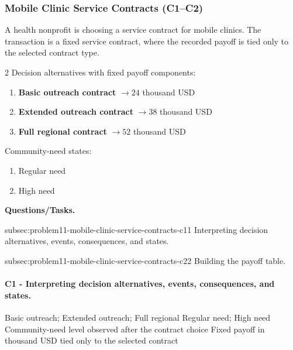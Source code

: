
	\subsubsection{Mobile Clinic Service Contracts (C1--C2)}
	\label{sec:problem11-mobile-clinic-service-contracts-c1-c2}
	A health nonprofit is choosing a service contract for mobile clinics. The transaction is a fixed service contract, where the recorded payoff is tied only to the selected contract type.

	\begin{multicols}{2}
		Decision alternatives with fixed payoff components:
		\begin{enumerate}[label=\arabic*.]
			\item \textbf{Basic outreach contract} $\to 24$ thousand USD
			\item \textbf{Extended outreach contract} $\to 38$ thousand USD
			\item \textbf{Full regional contract} $\to 52$ thousand USD
		\end{enumerate}

			\columnbreak

		Community-need states:
		\begin{enumerate}[label=\arabic*.]
			\item Regular need
			\item High need
		\end{enumerate}
	\end{multicols}

	\textbf{Questions/Tasks.}
	\begin{enumerate}
		\CriterionTask
		{subsec:problem11-mobile-clinic-service-contracts-c1}{1}
		{Interpreting decision alternatives, events, consequences, and states.}

		\CriterionTask
		{subsec:problem11-mobile-clinic-service-contracts-c2}{2}
		{Building the payoff table.}
	\end{enumerate}

	\paragraph*{C1 - Interpreting decision alternatives, events, consequences, and states.}
	\label{subsec:problem11-mobile-clinic-service-contracts-c1}
	\DecisionElementsTable
	{Basic outreach; Extended outreach; Full regional}
	{Regular need; High need}
	{Community-need level observed after the contract choice}
	{Fixed payoff in thousand USD tied only to the selected contract}

